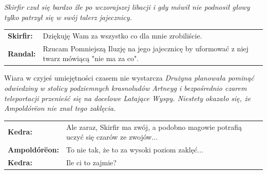 \documentclass[10pt,twoside,twocolumn]{book}
\begin{document}
\begin{rpg-quotebox}{}
   \textit{Skirfir czuł się bardzo źle po wczorajszej libacji i gdy mówił nie podnosił głowy tylko patrzył się w swój talerz jajecznicy.}\\

   \begin{tabularx}{\columnwidth}{lX}
      \textbf{Skirfir:} & Dziękuję Wam za wszystko co dla mnie zrobiliście.\\
      \textbf{Randal:} & Rzucam Pomniejszą Iluzję na jego jajecznicę by uformować z niej twarz mówiącą "nie ma za co".\\
   \end{tabularx}
\end{rpg-quotebox}


\begin{rpg-quotebox}{Wiara w czyjeś umiejętności czasem nie wystarcza}
   \textit{Drużyna planowała pominąć odwiedziny w stolicy podziemnych krasnoludów Artneyg i bezpośrednio czarem teleportacji przenieść się na docelowe Latające Wyspy. Niestety okazało się, że Ampoldórëon nie znał tego zaklęcia.}\\

   \begin{tabularx}{\columnwidth}{lX}
      \textbf{Kedra:} & Ale zaraz, Skirfir ma zwój, a podobno magowie potrafią uczyć się czarów ze zwojów...\\
      \textbf{Ampoldórëon:} & To nie tak, że to za wysoki poziom zaklęć...\\
      \textbf{Kedra:} & Ile ci to zajmie?\\
   \end{tabularx}
\end{rpg-quotebox}



%    
%       
\end{document}
